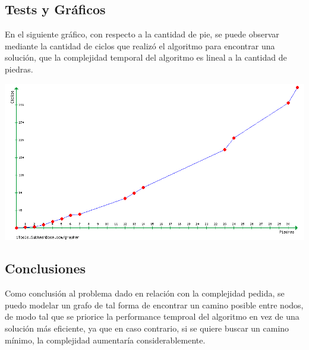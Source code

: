 \subsection{Tests y Gráficos}
En el siguiente gráfico, con respecto a la cantidad de pie, se puede observar mediante la cantidad de ciclos que realizó el algoritmo para encontrar una solución, que la complejidad temporal del algoritmo es lineal a la cantidad de piedras.
\begin {center}
\includegraphics[width=15cm]{./graficos/grafico_ej3_0.png}
\end {center} 


\subsection{Conclusiones}
Como conclusión al problema dado en relación con la complejidad pedida, se puedo modelar un grafo de tal forma de encontrar un camino posible entre nodos, de modo tal que se priorice la performance temproal del algoritmo en vez de una solución más eficiente, ya que en caso contrario, si se quiere buscar un camino mínimo, la complejidad aumentaría considerablemente. 
